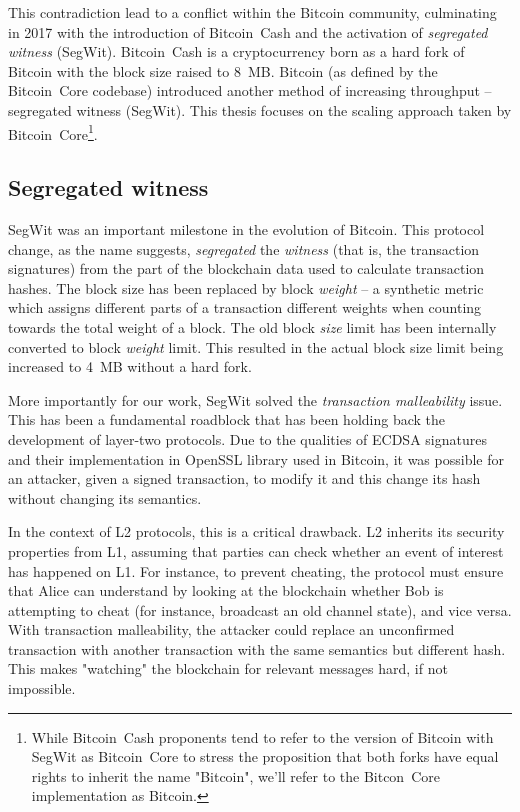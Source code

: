 This contradiction lead to a conflict within the Bitcoin community, culminating in 2017 with the introduction of Bitcoin~Cash and the activation of \textit{segregated witness} (SegWit).
Bitcoin~Cash is a cryptocurrency born as a hard fork of Bitcoin with the block size raised to 8~MB.
Bitcoin (as defined by the Bitcoin~Core codebase) introduced another method of increasing throughput -- segregated witness (SegWit).
This thesis focuses on the scaling approach taken by Bitcoin~Core\footnote{While Bitcoin~Cash proponents tend to refer to the version of Bitcoin with SegWit as Bitcoin~Core to stress the proposition that both forks have equal rights to inherit the name "Bitcoin", we'll refer to the Bitcon~Core implementation as Bitcoin.}.

\subsection{Segregated witness}

SegWit was an important milestone in the evolution of Bitcoin.
This protocol change, as the name suggests, \textit{segregated} the \textit{witness} (that is, the transaction signatures) from the part of the blockchain data used to calculate transaction hashes.
The block size has been replaced by block \textit{weight} -- a synthetic metric which assigns different parts of a transaction different weights when counting towards the total weight of a block.
The old block \textit{size} limit has been internally converted to block \textit{weight} limit.
This resulted in the actual block size limit being increased to 4~MB without a hard fork.

More importantly for our work, SegWit solved the \textit{transaction malleability} issue.
This has been a fundamental roadblock that has been holding back the development of layer-two protocols.
Due to the qualities of ECDSA signatures and their implementation in OpenSSL library used in Bitcoin, it was possible for an attacker, given a signed transaction, to modify it and this change its hash without changing its semantics.

In the context of L2 protocols, this is a critical drawback.
L2 inherits its security properties from L1, assuming that parties can check whether an event of interest has happened on L1.
For instance, to prevent cheating, the protocol must ensure that Alice can understand by looking at the blockchain whether Bob is attempting to cheat (for instance, broadcast an old channel state), and vice versa.
With transaction malleability, the attacker could replace an unconfirmed transaction with another transaction with the same semantics but different hash.
This makes "watching" the blockchain for relevant messages hard, if not impossible.

